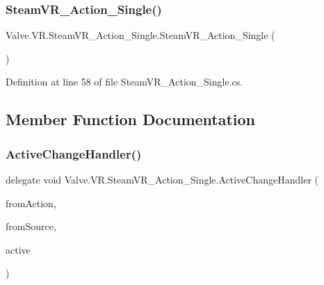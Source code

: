 \subsubsection{\texorpdfstring{SteamVR\_Action\_Single()}{SteamVR\_Action\_Single()}}
{\footnotesize\ttfamily Valve.\+V\+R.\+Steam\+V\+R\+\_\+\+Action\+\_\+\+Single.\+Steam\+V\+R\+\_\+\+Action\+\_\+\+Single (\begin{DoxyParamCaption}{ }\end{DoxyParamCaption})}



Definition at line 58 of file Steam\+V\+R\+\_\+\+Action\+\_\+\+Single.\+cs.



\subsection{Member Function Documentation}
\mbox{\label{class_valve_1_1_v_r_1_1_steam_v_r___action___single_a45ad70dbb8a58191f373b7ae098b833b}} 
\subsubsection{\texorpdfstring{ActiveChangeHandler()}{ActiveChangeHandler()}}
{\footnotesize\ttfamily delegate void Valve.\+V\+R.\+Steam\+V\+R\+\_\+\+Action\+\_\+\+Single.\+Active\+Change\+Handler (\begin{DoxyParamCaption}\item[{\mbox{\hyperlink{class_valve_1_1_v_r_1_1_steam_v_r___action___single}{Steam\+V\+R\+\_\+\+Action\+\_\+\+Single}}}]{from\+Action,  }\item[{\mbox{\hyperlink{namespace_valve_1_1_v_r_a82e5bf501cc3aa155444ee3f0662853f}{Steam\+V\+R\+\_\+\+Input\+\_\+\+Sources}}}]{from\+Source,  }\item[{bool}]{active }\end{DoxyParamCaption})}

\mbox{\label{class_valve_1_1_v_r_1_1_steam_v_r___action___single_a1b05b455c3734492cc844b3afca8a59e}} 

